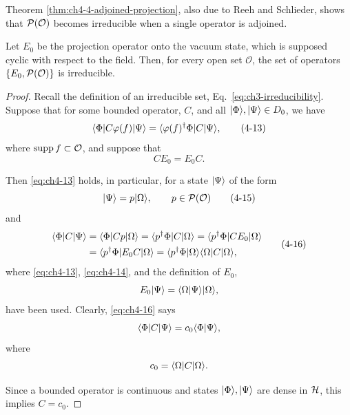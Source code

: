 Theorem \ref{thm:ch4-4-adjoined-projection}, also due to Reeh and Schlieder, shows that
$\mathcal{P}(\mathcal O)$ becomes irreducible when a single operator
is adjoined.

\begin{theorem}[4-4]\label{thm:ch4-4-adjoined-projection}
Let $E_0$ be the projection operator onto the vacuum state, which is supposed
cyclic with respect to the field. Then, for every open set $\mathcal O$, the
set of operators $\{E_0,\mathcal{P}(\mathcal O)\}$ is irreducible.

\begin{proof}
Recall the definition of an irreducible set, Eq.~\eqref{eq:ch3-irreducibility}. Suppose that for some
bounded operator, $C$, and all $\lvert \Phi\rangle,\lvert \Psi\rangle\in D_0$, we have
\begin{equation}
  \langle \Phi\vert C\varphi(f)\vert \Psi\rangle
  =\langle \varphi(f)^\dagger\Phi\vert C\vert \Psi\rangle,
  \tag{4-13}\label{eq:ch4-13}
\end{equation}
where $\operatorname{supp} f\subset\mathcal O$, and suppose that
\begin{equation}
  CE_0=E_0C.
  \tag{4-14}\label{eq:ch4-14}
\end{equation}

Then \eqref{eq:ch4-13} holds, in particular, for a state $\lvert \Psi\rangle$ of the form
\begin{equation}
  \lvert \Psi\rangle=p\lvert \Omega\rangle,\qquad
  p\in\mathcal{P}(\mathcal O)
  \tag{4-15}\label{eq:ch4-15}
\end{equation}
and
\begin{equation}
\begin{aligned}
  \langle \Phi\rvert C\lvert \Psi\rangle
    &=\langle \Phi\rvert Cp\lvert \Omega\rangle
     =\langle p^\dagger\Phi\rvert C\lvert \Omega\rangle
     =\langle p^\dagger\Phi\rvert CE_0\lvert \Omega\rangle \\
    &=\langle p^\dagger\Phi\rvert E_0C\lvert \Omega\rangle
     =\langle p^\dagger\Phi\vert \Omega\rangle
      \langle \Omega\rvert C\lvert \Omega\rangle,
\end{aligned}
\tag{4-16}\label{eq:ch4-16}
\end{equation}
where \eqref{eq:ch4-13}, \eqref{eq:ch4-14}, and the definition of $E_0$,
\begin{equation*}
  E_0\lvert \Psi\rangle=\langle \Omega\vert \Psi\rangle\lvert \Omega\rangle,
\end{equation*}
have been used. Clearly, \eqref{eq:ch4-16} says
\begin{equation*}
  \langle \Phi\rvert C\lvert \Psi\rangle=c_0\langle \Phi\vert \Psi\rangle,
\end{equation*}
where
\begin{equation*}
  c_0=\langle \Omega\rvert C\lvert \Omega\rangle.
\end{equation*}

Since a bounded operator is continuous and states $\lvert \Phi\rangle,\lvert \Psi\rangle$ are
dense in $\mathcal{H}$, this implies $C=c_0$.
\end{proof}
\end{theorem}

